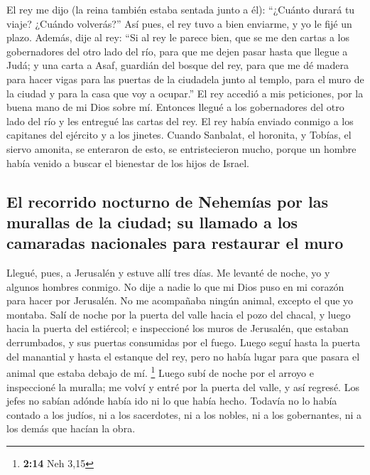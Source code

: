  El rey me dijo (la reina también estaba sentada junto a
él): ``¿Cuánto durará tu viaje? ¿Cuándo volverás?'' Así pues, el rey
tuvo a bien enviarme, y yo le fijé un plazo.  Además, dije
al rey: ``Si al rey le parece bien, que se me den cartas a los
gobernadores del otro lado del río, para que me dejen pasar hasta que
llegue a Judá;  y una carta a Asaf, guardián del bosque
del rey, para que me dé madera para hacer vigas para las puertas de la
ciudadela junto al templo, para el muro de la ciudad y para la casa que
voy a ocupar.'' El rey accedió a mis peticiones, por la buena mano de mi
Dios sobre mí.  Entonces llegué a los gobernadores del
otro lado del río y les entregué las cartas del rey. El rey había
enviado conmigo a los capitanes del ejército y a los jinetes.
 Cuando Sanbalat, el horonita, y Tobías, el siervo
amonita, se enteraron de esto, se entristecieron mucho, porque un hombre
había venido a buscar el bienestar de los hijos de Israel.

\hypertarget{el-recorrido-nocturno-de-nehemuxedas-por-las-murallas-de-la-ciudad-su-llamado-a-los-camaradas-nacionales-para-restaurar-el-muro}{%
\subsection{El recorrido nocturno de Nehemías por las murallas de la
ciudad; su llamado a los camaradas nacionales para restaurar el
muro}\label{el-recorrido-nocturno-de-nehemuxedas-por-las-murallas-de-la-ciudad-su-llamado-a-los-camaradas-nacionales-para-restaurar-el-muro}}

 Llegué, pues, a Jerusalén y estuve allí tres días.
 Me levanté de noche, yo y algunos hombres conmigo. No
dije a nadie lo que mi Dios puso en mi corazón para hacer por Jerusalén.
No me acompañaba ningún animal, excepto el que yo montaba.
 Salí de noche por la puerta del valle hacia el pozo del
chacal, y luego hacia la puerta del estiércol; e inspeccioné los muros
de Jerusalén, que estaban derrumbados, y sus puertas consumidas por el
fuego.  Luego seguí hasta la puerta del manantial y hasta
el estanque del rey, pero no había lugar para que pasara el animal que
estaba debajo de mí. \footnote{\textbf{2:14} Neh 3,15} 
Luego subí de noche por el arroyo e inspeccioné la muralla; me volví y
entré por la puerta del valle, y así regresé.  Los jefes
no sabían adónde había ido ni lo que había hecho. Todavía no lo había
contado a los judíos, ni a los sacerdotes, ni a los nobles, ni a los
gobernantes, ni a los demás que hacían la obra.

